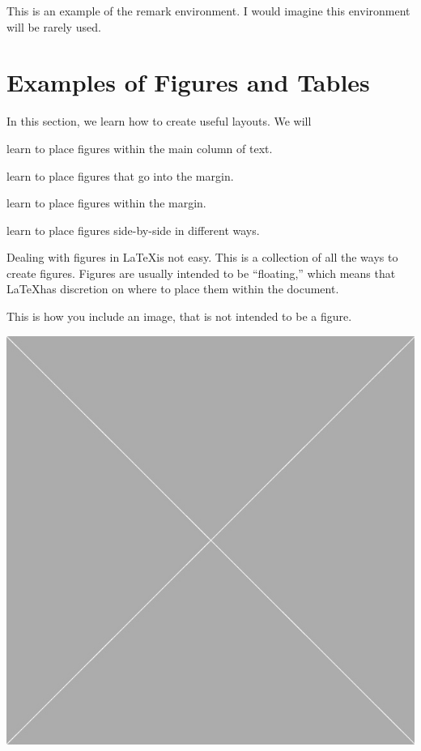 \documentclass[10pt,oneside]{book}
\begin{document}
\begin{remark}
  This is an example of the remark environment.
  I would imagine this environment will be rarely used.
\end{remark}








\newpage

\section{Examples of Figures and Tables}


\begin{objectives}{In this section, we learn how to create useful layouts. We will}
    \item
      learn to place figures within the main column of text.
    \item
      learn to place figures that go into the margin.
    \item
      learn to place figures within the margin.
    \item
      learn to place figures side-by-side in different ways.
  \end{objectives}


Dealing with figures in \LaTeX is not easy.  This is a collection of all the
ways to create figures.  Figures are usually intended to be ``floating,'' which
means that \LaTeX has discretion on where to place them within the document.



This is how you include an image, that is not intended to be a figure.

\includegraphics[width=0.9\linewidth]{Pictures/placeholder.jpg}
\end{document}
